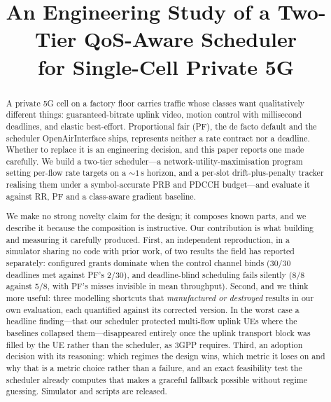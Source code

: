 \documentclass[conference]{IEEEtran}
\begin{document}
\title{An Engineering Study of a Two-Tier QoS-Aware Scheduler\\
for Single-Cell Private 5G}

\author{
}

\maketitle

\begin{abstract}
A private 5G cell on a factory floor carries traffic whose classes want
qualitatively different things: guaranteed-bitrate uplink video, motion
control with millisecond deadlines, and elastic best-effort. Proportional
fair (PF), the de facto default and the scheduler OpenAirInterface ships,
represents neither a rate contract nor a deadline. Whether to replace it is
an engineering decision, and this paper reports one made carefully. We build
a two-tier scheduler---a network-utility-maximisation program setting
per-flow rate targets on a ${\sim}1$\,s horizon, and a per-slot
drift-plus-penalty tracker realising them under a symbol-accurate PRB and
PDCCH budget---and evaluate it against RR, PF and a class-aware gradient
baseline.

We make no strong novelty claim for the design; it composes known parts, and
we describe it because the composition is instructive. Our contribution is
what building and measuring it carefully produced. First, an independent
reproduction, in a simulator sharing no code with prior work, of two results
the field has reported separately: configured grants dominate when the
control channel binds (30/30 deadlines met against PF's 2/30), and
deadline-blind scheduling fails silently (8/8 against 5/8, with PF's misses
invisible in mean throughput). Second, and we think more useful: three
modelling shortcuts that \emph{manufactured or destroyed} results in our own
evaluation, each quantified against its corrected version. In the worst
case a headline finding---that our scheduler protected multi-flow uplink UEs
where the baselines collapsed them---disappeared entirely once the uplink
transport block was filled by the UE rather than the scheduler, as 3GPP
requires. Third, an adoption decision with its reasoning: which regimes the
design wins, which metric it loses on and why that is a metric choice rather
than a failure, and an exact feasibility test the scheduler already computes
that makes a graceful fallback possible without regime guessing. Simulator
and scripts are released.
\end{abstract}
\end{document}
